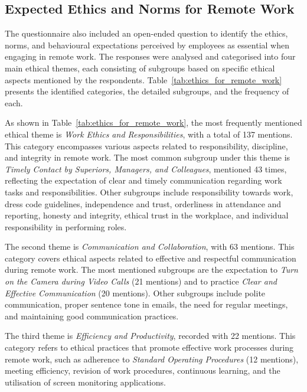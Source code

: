 \documentclass[a4paper, conference]{IEEEtran}
\begin{document}
\subsection{Expected Ethics and Norms for Remote Work}
\label{sec:ethics-remote-work}

The questionnaire also included an open-ended question to identify the ethics, norms, and behavioural expectations perceived by employees as essential when engaging in remote work. The responses were analysed and categorised into four main ethical themes, each consisting of subgroups based on specific ethical aspects mentioned by the respondents. Table~\ref{tab:ethics_for_remote_work} presents the identified categories, the detailed subgroups, and the frequency of each.

As shown in Table~\ref{tab:ethics_for_remote_work}, the most frequently mentioned ethical theme is \textit{Work Ethics and Responsibilities}, with a total of 137 mentions. This category encompasses various aspects related to responsibility, discipline, and integrity in remote work. The most common subgroup under this theme is \textit{Timely Contact by Superiors, Managers, and Colleagues}, mentioned 43 times, reflecting the expectation of clear and timely communication regarding work tasks and responsibilities. Other subgroups include responsibility towards work, dress code guidelines, independence and trust, orderliness in attendance and reporting, honesty and integrity, ethical trust in the workplace, and individual responsibility in performing roles.

The second theme is \textit{Communication and Collaboration}, with 63 mentions. This category covers ethical aspects related to effective and respectful communication during remote work. The most mentioned subgroups are the expectation to \textit{Turn on the Camera during Video Calls} (21 mentions) and to practice \textit{Clear and Effective Communication} (20 mentions). Other subgroups include polite communication, proper sentence tone in emails, the need for regular meetings, and maintaining good communication practices.

The third theme is \textit{Efficiency and Productivity}, recorded with 22 mentions. This category refers to ethical practices that promote effective work processes during remote work, such as adherence to \textit{Standard Operating Procedures} (12 mentions), meeting efficiency, revision of work procedures, continuous learning, and the utilisation of screen monitoring applications.
\end{document}
